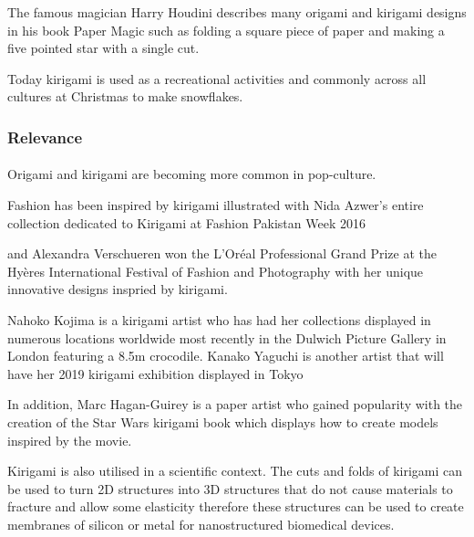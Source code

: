 \documentclass[11pt]{article}
\begin{document}
           
           The famous magician Harry Houdini describes many origami and kirigami designs in his book Paper Magic such as folding a square piece of paper and making a five pointed star with a single cut. %
           
           
           Today kirigami is used as a recreational activities and commonly across all cultures at Christmas to make snowflakes.
    
            \subsubsection{Relevance}
                \paragraph{} 
                Origami and kirigami are becoming more common in pop-culture. 
                
                Fashion has been inspired by kirigami illustrated with Nida Azwer's entire collection dedicated to Kirigami at Fashion Pakistan Week 2016 

                and Alexandra Verschueren won the L'Oréal Professional Grand Prize at the Hyères International Festival of Fashion and Photography with her unique innovative designs inspried by kirigami.  %
                
                Nahoko Kojima is a kirigami artist who has had her collections displayed in numerous locations worldwide most recently in the Dulwich Picture Gallery in London featuring a 8.5m crocodile. %
                Kanako Yaguchi is another artist that will have her 2019 kirigami exhibition displayed in Tokyo %
                
                In addition, Marc Hagan-Guirey is a paper artist who gained popularity with the creation of the Star Wars kirigami book which displays how to create models inspired by the movie. %
            
                Kirigami is also utilised in a scientific context. The cuts and folds of kirigami can be used to turn 2D structures into 3D structures that do not cause materials to fracture and allow some elasticity therefore these structures can be used to create membranes of silicon or metal for nanostructured biomedical devices. %
                
\end{document}
